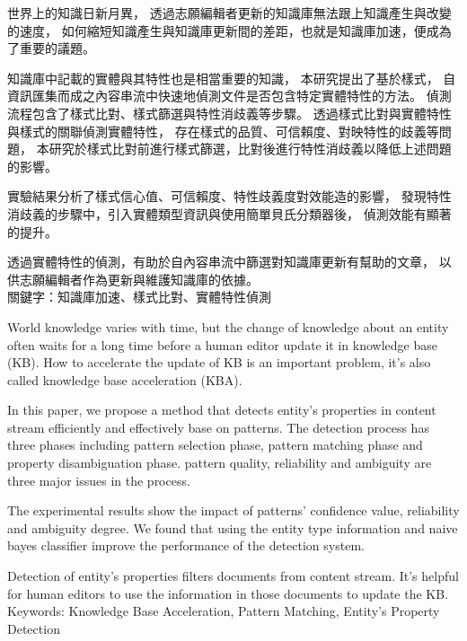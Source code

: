\begin{abstractzh}

世界上的知識日新月異，
透過志願編輯者更新的知識庫無法跟上知識產生與改變的速度，
如何縮短知識產生與知識庫更新間的差距，也就是知識庫加速，便成為了重要的議題。

知識庫中記載的實體與其特性也是相當重要的知識，
本研究提出了基於樣式，
自資訊匯集而成之內容串流中快速地偵測文件是否包含特定實體特性的方法。
偵測流程包含了樣式比對、樣式篩選與特性消歧義等步驟。
透過樣式比對與實體特性與樣式的關聯偵測實體特性，
存在樣式的品質、可信賴度、對映特性的歧義等問題，
本研究於樣式比對前進行樣式篩選，比對後進行特性消歧義以降低上述問題的影響。

實驗結果分析了樣式信心值、可信賴度、特性歧義度對效能造的影響，
發現特性消歧義的步驟中，引入實體類型資訊與使用簡單貝氏分類器後，
偵測效能有顯著的提升。

透過實體特性的偵測，有助於自內容串流中篩選對知識庫更新有幫助的文章，
以供志願編輯者作為更新與維護知識庫的依據。\\

\noindent
關鍵字：知識庫加速、樣式比對、實體特性偵測

\end{abstractzh}

\begin{abstracten}

World knowledge varies with time, 
but the change of knowledge about an entity often waits for 
a long time before a human editor update it in knowledge base (KB).
How to accelerate the update of KB is an important problem, 
it's also called knowledge base acceleration (KBA).

In this paper, we propose a method that detects entity's properties 
in content stream efficiently and effectively base on patterns. 
The detection process has three phases including
pattern selection phase, pattern matching phase and 
property disambiguation phase.
pattern quality, reliability and ambiguity 
are three major issues in the process.

The experimental results show the impact of 
patterns' confidence value, reliability and ambiguity degree.
We found that using the entity type information and naive bayes classifier 
improve the performance of the detection system.

Detection of entity's properties filters documents from content stream.
It's helpful for human editors to use the information in those documents to update the KB.\\

\noindent
Keywords: Knowledge Base Acceleration, Pattern Matching, Entity's Property Detection
\end{abstracten}

